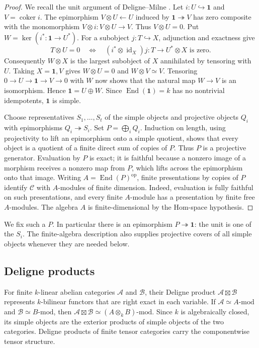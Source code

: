 \begin{proof}
We recall the unit argument of Deligne--Milne
\cite[Proposition~1.17]{DeligneMilne1982}.  Let $i:U\hookrightarrow\mathbf1$
and $V=\operatorname{coker}i$.  The epimorphism
$V\otimes U\leftarrow U$ induced by $\mathbf1\twoheadrightarrow V$
has zero composite with the monomorphism $V\otimes i:V\otimes U\to V$.
Thus $V\otimes U=0$.  Put $W=\ker(i^*:\mathbf1\to U^*)$.
For a subobject $j:T\hookrightarrow X$, adjunction and exactness give
\[
 T\otimes U=0
 \quad\Longleftrightarrow\quad
 (i^*\otimes\operatorname{id}_X)j:T\longrightarrow U^*\otimes X
 \text{ is zero}.
\]
Consequently $W\otimes X$ is the largest subobject of $X$ annihilated by
tensoring with $U$.  Taking $X=\mathbf1,V$ gives
$W\otimes U=0$ and $W\otimes V\simeq V$.  Tensoring
$0\to U\to\mathbf1\to V\to0$ with $W$ now shows that the natural map
$W\to V$ is an isomorphism.  Hence $\mathbf1=U\oplus W$.
Since $\operatorname{End}(\mathbf1)=k$ has no nontrivial idempotents,
$\mathbf1$ is simple.

Choose representatives $S_1,\dots,S_t$ of the simple objects and projective
objects $Q_i$ with epimorphisms $Q_i\twoheadrightarrow S_i$.  Set
$P=\bigoplus_iQ_i$.  Induction on length, using projectivity to lift an
epimorphism onto a simple quotient, shows that every object is a quotient
of a finite direct sum of copies of $P$.  Thus $P$ is a projective
generator.  Evaluation by $P$ is exact; it is faithful because a nonzero
image of a morphism receives a nonzero map from $P$, which lifts across
the epimorphism onto that image.  Writing
$A=\operatorname{End}(P)^{\mathrm{op}}$, finite presentations by copies of
$P$ identify $\mathcal C$ with $A$-modules of finite dimension.  Indeed,
evaluation is fully faithful on such presentations, and every finite
$A$-module has a presentation by finite free $A$-modules.  The algebra
$A$ is finite-dimensional by the Hom-space hypothesis.
\end{proof}

We fix such a $P$.  In particular there is an epimorphism
$P\twoheadrightarrow\mathbf1$: the unit is one of the $S_i$.
The finite-algebra description also supplies projective covers of all
simple objects whenever they are needed below.


\subsection{Deligne products}

For finite $k$-linear abelian categories $\mathcal A$ and $\mathcal B$,
their Deligne product $\mathcal A\boxtimes\mathcal B$ represents
$k$-bilinear functors that are right exact in each variable.
If $\mathcal A\simeq A\text{-}\mathrm{mod}$ and
$\mathcal B\simeq B\text{-}\mathrm{mod}$, then
$\mathcal A\boxtimes\mathcal B\simeq(A\otimes_k B)\text{-}\mathrm{mod}$.
Since $k$ is algebraically closed, its simple objects are the exterior
products of simple objects of the two categories. Deligne products
of finite tensor categories carry the componentwise tensor structure.

